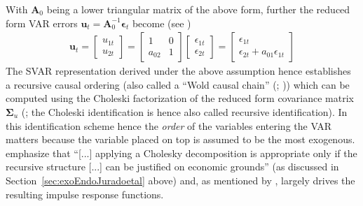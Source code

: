 \documentclass[a4paper,11pt,listof=nochaptergap,oneside,pointednumbers,bibtotoc,bigheadings,liststotoc,hidelinks]{scrbook}
\theoremstyle{mysatz}
\theoremstyle{mydefinition}
\theoremstyle{mytheorem}
\theoremstyle{mybemerkung}
\newcommand{\vect}[1]{\boldsymbol{\mathbf{#1}}}
\begin{document}
With $\vect{A}_0$ being a lower triangular matrix of the above form, further the reduced form VAR errors $\vect{u}_t = \vect{A}_0^{-1}\vect{\epsilon}_t$ become (see \citealp{zivot:00})
\begin{equation} \label{eq:svar13}
\begin{split}
 		\vect{u}_t = \begin{bmatrix}
    					u_{1t} \\
					u_{2t} 
 					\end{bmatrix} = 
						\begin{bmatrix}
    						1 & 0 \\
						a_{02} & 1  
 						\end{bmatrix} 
							\begin{bmatrix}
    							\epsilon_{1t} \\
							\epsilon_{2t} 
 							\end{bmatrix} = 
								\begin{bmatrix}
    								\epsilon_{1t} \\
								\epsilon_{2t}+a_{01}\epsilon_{1t} 
 								\end{bmatrix} 			
\end{split}								
\end{equation}
The SVAR representation derived under the above assumption hence establishes a recursive causal ordering (also called a ``Wold causal chain'' (\citealp{stockwatson:01}; \citealp{rossi:11})) which can be computed using the Choleski factorization of the reduced form covariance matrix $\vect{\Sigma}_u$ (\citealp{zivot:00}; the Choleski identification is hence also called recursive identification). In this identification scheme hence the \textit{order} of the variables entering the VAR matters because the variable placed on top is assumed to be the most exogenous. \citet[p. 2020]{lutkepohlkilian:17} emphasize that ``[...] applying a Cholesky decomposition is appropriate only if the recursive structure [...] can be justified on economic grounds''  (as discussed in Section~\ref{sec:exoEndoJuradoetal} above) and, as mentioned by \citet{lutkepohl:05}, largely drives the resulting impulse response functions.
\end{document}
